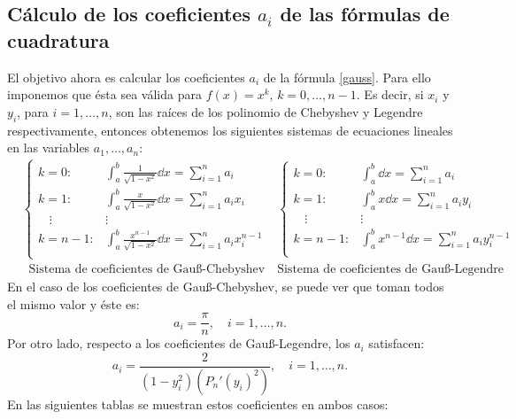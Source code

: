 \documentclass[a4paper]{article}
\begin{document}
\subsection*{Cálculo de los coeficientes $a_i$ de las fórmulas de cuadratura}
El objetivo ahora es calcular los coeficientes $a_i$ de la fórmula \eqref{gauss}. Para ello imponemos que ésta sea válida para $f(x)=x^k$, $k=0,\ldots,n-1$. Es decir, si $x_i$ y $y_i$, para $i=1,\ldots,n$, son las raíces de los polinomio de Chebyshev y Legendre respectivamente, entonces obtenemos los siguientes sistemas de ecuaciones lineales en las variables $a_1,\ldots,a_n$:
\begin{align*}
    &\left\{
    \begin{array}{lc}
        k=0: & \displaystyle\int_a^b\frac{1}{\sqrt{1-x^2}}\dd x=\sum_{i=1}^na_i\\
        k=1: & \displaystyle\int_a^b\frac{x}{\sqrt{1-x^2}}\dd x=\sum_{i=1}^na_ix_i\\
        \hspace{11pt}\vdots & \vdots \\
        k=n-1: & \displaystyle\int_a^b\frac{x^{n-1}}{\sqrt{1-x^2}}\dd x=\sum_{i=1}^na_ix_i^{n-1}\\
    \end{array}\right.
     &
    \left\{
    \begin{array}{lc}
        k=0: & \displaystyle\int_a^b\dd x=\sum_{i=1}^na_i\\
        k=1: & \displaystyle\int_a^bx\dd x=\sum_{i=1}^na_iy_i\\
        \hspace{11pt}\vdots & \vdots \\
        k=n-1: & \displaystyle\int_a^bx^{n-1}\dd x=\sum_{i=1}^na_iy_i^{n-1}\\
    \end{array}\right.
    \\
    &\;\;\text{Sistema de coeficientes de Gau\ss-Chebyshev} & \text{Sistema de coeficientes de Gau\ss-Legendre}
\end{align*}
En el caso de los coeficientes de Gau\ss-Chebyshev, se puede ver que toman todos el mismo valor y éste es: $$a_i=\frac{\pi}{n},\quad i=1,\ldots,n.$$ Por otro lado, respecto a los coeficientes de Gau\ss-Legendre, los $a_i$ satisfacen: $$a_i=\frac{2}{(1-y_i^2)(P_n'(y_i)^2)},\quad i=1,\ldots,n.$$ En las siguientes tablas se muestran estos coeficientes en ambos casos:
\end{document}
